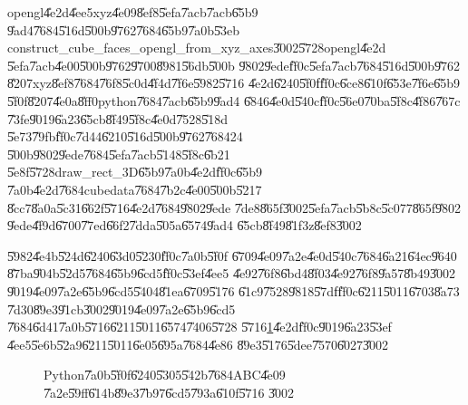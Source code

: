 \bigskip

opengl\U{4e2d}\U{4ee5}xyz\U{4e09}\U{8ef8}\U{5efa}\U{7acb}\U{7acb}\U{65b9}%
\U{9ad4}\U{7684}\U{516d}\U{500b}\U{9762}\U{7684}\U{65b9}\U{7a0b}\U{53eb}%
construct\_cube\_faces\_opengl\_from\_xyz\_axes\U{3002}\U{5728}opengl\U{4e2d}%
\U{5efa}\U{7acb}\U{4e00}\U{500b}\U{9762}\U{9700}\U{8981}\U{56db}\U{500b}%
\U{9802}\U{9ede}\U{ff0c}\U{5efa}\U{7acb}\U{7684}\U{516d}\U{500b}\U{9762}%
\U{8207}xyz\U{8ef8}\U{7684}\U{76f8}\U{5c0d}\U{4f4d}\U{7f6e}\U{5982}\U{5716}%
\U{4e2d}\U{6240}\U{5f0f}\U{ff0c}\U{6ce8}\U{610f}\U{653e}\U{7f6e}\U{65b9}%
\U{5f0f}\U{8207}\U{4e0a}\U{8ff0}python\U{7684}\U{7acb}\U{65b9}\U{9ad4}%
\U{6846}\U{4e0d}\U{540c}\U{ff0c}\U{56e0}\U{70ba}\U{5f8c}\U{4f86}\U{767c}%
\U{73fe}\U{9019}\U{6a23}\U{65cb}\U{8f49}\U{5f8c}\U{4e0d}\U{7528}\U{518d}%
\U{5e73}\U{79fb}\U{ff0c}\U{7d44}\U{6210}\U{516d}\U{500b}\U{9762}\U{7684}24%
\U{500b}\U{9802}\U{9ede}\U{7684}\U{5efa}\U{7acb}\U{5148}\U{5f8c}\U{6b21}%
\U{5e8f}\U{5728}draw\_rect\_3D\U{65b9}\U{7a0b}\U{4e2d}\U{ff0c}\U{65b9}%
\U{7a0b}\U{4e2d}\U{7684}cubedata\U{7684}\U{7b2c}\U{4e00}\U{500b}\U{5217}%
\U{8cc7}\U{8a0a}\U{5c31}\U{662f}\U{5716}\U{4e2d}\U{7684}\U{9802}\U{9ede}%
\U{7de8}\U{865f}\U{3002}\U{5efa}\U{7acb}\U{5b8c}\U{5c07}7\U{865f}\U{9802}%
\U{9ede}\U{4f9d}\U{6700}\U{77ed}\U{66f2}\U{7dda}\U{505a}\U{6574}\U{9ad4}%
\U{65cb}\U{8f49}\U{81f3}z\U{8ef8}\U{3002}

\bigskip

\U{5982}\U{4e4b}\U{524d}\U{6240}\U{63d0}\U{5230}\U{ff0c}\U{7a0b}\U{5f0f}%
\U{6709}\U{4e09}\U{7a2e}\U{4e0d}\U{540c}\U{7684}\U{6a21}\U{64ec}\U{9640}%
\U{87ba}\U{904b}\U{52d5}\U{7684}\U{65b9}\U{6cd5}\U{ff0c}\U{53ef}\U{4ee5}%
\U{4e92}\U{76f8}\U{6bd4}\U{8f03}\U{4e92}\U{76f8}\U{9a57}\U{8b49}\U{3002}%
\U{9019}\U{4e09}\U{7a2e}\U{65b9}\U{6cd5}\U{5404}\U{81ea}\U{6709}\U{5176}%
\U{61c9}\U{7528}\U{9818}\U{57df}\U{ff0c}\U{6211}\U{5011}\U{6703}\U{8a73}%
\U{7d30}\U{89e3}\U{91cb}\U{3002}\U{9019}\U{4e09}\U{7a2e}\U{65b9}\U{6cd5}%
\U{7684}\U{6d41}\U{7a0b}\U{5716}\U{6211}\U{5011}\U{6574}\U{7406}\U{5728}%
\U{5716}\ref{ABCmethodsIllustration}\U{4e2d}\U{ff0c}\U{9019}\U{6a23}\U{53ef}%
\U{4ee5}\U{5e6b}\U{52a9}\U{6211}\U{5011}\U{6e05}\U{695a}\U{7684}\U{4e86}%
\U{89e3}\U{5176}\U{5dee}\U{7570}\U{6027}\U{3002}

\begin{figure}[th]
\caption{Python\U{7a0b}\U{5f0f}\U{6240}\U{5305}\U{542b}\U{7684}ABC\U{4e09}%
\U{7a2e}\U{59ff}\U{614b}\U{89e3}\U{7b97}\U{6cd5}\U{793a}\U{610f}\U{5716}%
\U{3002}}
\label{ABCmethodsIllustration}
\begin{center}

\end{center}
\end{figure}

